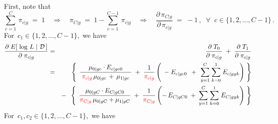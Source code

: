 First, note that
\begin{equation*}
\overset{C}{\underset{c=1}{\sum}}\,\pi_{c \vert g} \;=\; 1
\quad\Longrightarrow\quad
\pi_{C \vert g} \;=\; 1 - \overset{C-1}{\underset{c=1}{\sum}}\,\pi_{c \vert g}
\quad\Longrightarrow\quad
\dfrac{\partial\,\pi_{C \vert g}}{\partial\,\pi_{c \vert g}} \;=\; -1\,,
\;\;\forall\;\; c \in \{1,2,\ldots,C-1\}\,.
\end{equation*}
For \,$c_{1} \in \{1,2,\ldots,C-1\}$,\, we have
\begin{eqnarray*}
\dfrac{\partial\;E\!\left[\,\left.\log\,L\;\right\vert\,\mathcal{D}\,\right]}{\partial\;\pi_{c \vert g}}
&=& \dfrac{\partial\;T_{0}}{\partial\;\pi_{c \vert g}} \;+\; \dfrac{\partial\;T_{1}}{\partial\;\pi_{c \vert g}}
\\
&=&
	{\color{white}-} \;\;
	\left\{\;\,
		\dfrac{\mu_{0 \vert gc}\cdot E_{c \vert gc0}}{\mbox{}\;{\color{red}\pi_{c \vert g}}\,\mu_{0 \vert gc} \,+\, \mu_{1\vert gc}\;\mbox{}}
		\;+\;
		\dfrac{1}{{\color{red}\pi_{c \vert g}}}
		\left(
			\,\;-\;E_{c \vert gc0}
			\,\;+\;\,
			\overset{C}{\underset{y=1}{\sum}} \; \overset{1}{\underset{k=0}{\sum}} \; E_{c \vert gyk}
		\right)
	\;\right\}
\\
&&
	- \;\;
	\left\{\;\,
		\dfrac{\mu_{0 \vert gC} \cdot E_{C \vert gC0}}{{\color{red}\pi_{C \vert g}}\,\mu_{0 \vert gC}+\mu_{1\vert gC}}
		\;+\;
		\dfrac{1}{{\color{red}\pi_{C \vert g}}}
		\left(
			-\,E_{C \vert gC0}
			\;+\;
			\overset{C}{\underset{y=1}{\sum}} \; \overset{1}{\underset{k=0}{\sum}} \; E_{C \vert gyk}
		\right)
	\;\right\}
\end{eqnarray*}
For \,$c_{1}, c_{2} \in \{1,2,\ldots,C-1\}$,\, we have
